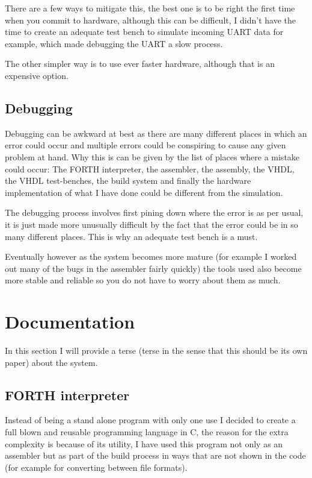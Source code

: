 \documentclass	[a4paper, 10pt]	{article}
\begin{document}
    There are a few ways
    to mitigate this, the best one is to be right the first time when you commit
    to hardware, although this can be difficult, I didn't have the time to create
    an adequate test bench to simulate incoming UART data for example, which made
    debugging the UART a slow process.

    The other simpler way is to use ever faster hardware, although that is an
    expensive option.

    \subsection{Debugging}

    Debugging can be awkward at best as there are many different places in which
    an error could occur and multiple errors could be conspiring to cause any
    given problem at hand. Why this is can be given by the list of places where
    a mistake could occur: The FORTH interpreter, the assembler, the assembly, the
    VHDL, the VHDL test-benches, the build system and finally the hardware implementation
    of what I have done could be different from the simulation. 

    The debugging process involves first pining down where the error is as
    per usual, it is just made more unusually difficult by the fact that the error
    could be in so many different places. This is why an adequate test bench is
    a must.

    Eventually however as the system becomes more mature (for example I worked out
    many of the bugs in the assembler fairly quickly) the tools used also become
    more stable and reliable so you do not have to worry about them as much.

  \section{Documentation}

  In this section I will provide a terse (terse in the sense that this should
  be its own paper) about the system.

    \subsection{FORTH interpreter}

    Instead of being a stand alone program with only one use I decided to create
    a full blown and reusable programming language in C, the reason for the extra
    complexity is because of its utility, I have used this program not only as an
    assembler but as part of the build process in ways that are not shown in the
    code (for example for converting between file formats).
\end{document}
